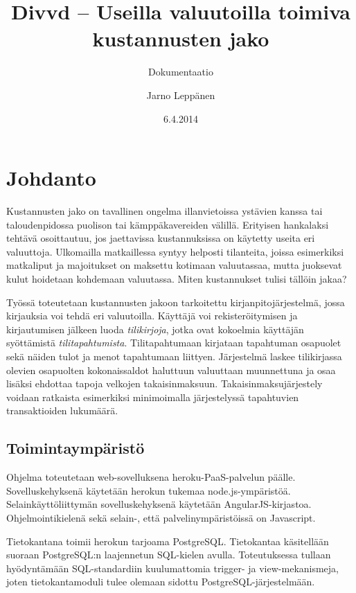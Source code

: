 \documentclass[a4paper,parskip=half]{scrartcl}
\author{Jarno Leppänen}
\title{Divvd -- Useilla valuutoilla toimiva kustannusten jako}
\subtitle{Dokumentaatio}
\date{6.4.2014}
\begin{document}
\maketitle

\tableofcontents

\section{Johdanto}

Kustannusten jako on tavallinen ongelma illanvietoissa ystävien
kanssa tai taloudenpidossa puolison tai kämppäkavereiden välillä. Erityisen
hankalaksi tehtävä osoittautuu, jos jaettavissa kustannuksissa on käytetty
useita eri valuuttoja. Ulkomailla matkaillessa syntyy helposti tilanteita,
joissa esimerkiksi matkaliput ja majoitukset on maksettu kotimaan valuutassaa,
mutta juoksevat kulut hoidetaan kohdemaan valuutassa. Miten kustannukset
tulisi tällöin jakaa?

Työssä toteutetaan kustannusten jakoon tarkoitettu kirjanpitojärjestelmä, jossa
kirjauksia voi tehdä eri valuutoilla. Käyttäjä voi rekisteröitymisen ja
kirjautumisen jälkeen luoda \textit{tilikirjoja}, jotka ovat kokoelmia
käyttäjän syöttämistä \textit{tilitapahtumista}. Tilitapahtumaan kirjataan
tapahtuman osapuolet sekä näiden tulot ja menot tapahtumaan liittyen.
Järjestelmä laskee tilikirjassa olevien osapuolten kokonaissaldot haluttuun
valuuttaan muunnettuna ja osaa lisäksi ehdottaa tapoja velkojen
takaisinmaksuun. Takaisinmaksujärjestely voidaan ratkaista esimerkiksi
minimoimalla järjestelyssä tapahtuvien transaktioiden
lukumäärä\cite{verhoeff2004settling}.

\subsection{Toimintaympäristö}

Ohjelma toteutetaan web-sovelluksena heroku-PaaS-palvelun päälle.
Sovelluskehyksenä käytetään herokun tukemaa node.js-ympäristöä.
Selainkäyttöliittymän sovelluskehyksenä käytetään AngularJS-kirjastoa.
Ohjelmointikielenä sekä selain-, että palvelinympäristöissä on Javascript.

Tietokantana toimii herokun tarjoama PostgreSQL. Tietokantaa käsitellään
suoraan Postgre\-SQL:n laajennetun SQL-kielen avulla. Toteutuksessa tullaan
hyödyntämään SQL-standardiin kuulumattomia trigger- ja view-mekanismeja, joten
tietokantamoduli tulee olemaan sidottu Post\-gre\-SQL-jär\-jes\-tel\-mään.
\end{document}
